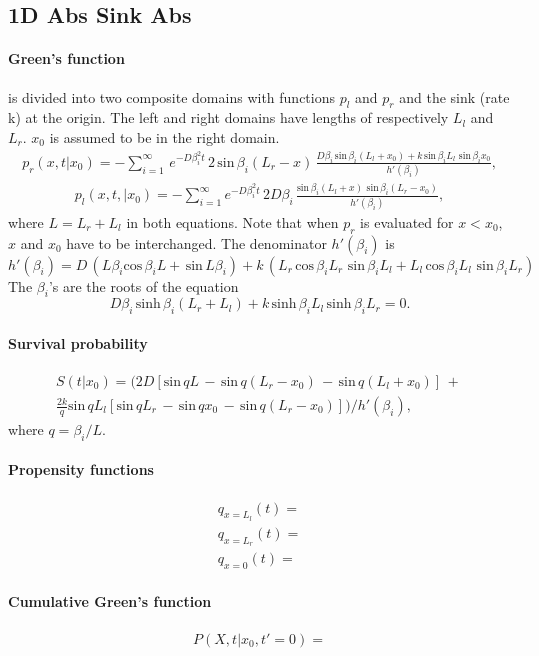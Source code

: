 
\subsection{1D Abs Sink Abs}

\paragraph{Green's function}
is divided into two composite domains with functions $p_l$ and $p_r$ and the sink (rate k) at the origin. The left and right domains have lengths of respectively $L_l$ and $L_r$. $x_0$ is assumed to be in the right domain.
 \begin{multline}
 p_r(x,t|x_0) = - \sum_{i=1}^{\infty} \, e^{- D \beta_i ^2 t} \, 2 \, \mathrm{sin} \, \beta_i (L_r - x) \, \frac{D \beta_i \, \mathrm{sin} \, \beta_i (L_l + x_0) + k \, \mathrm{sin} \, \beta_i L_l \,\, \mathrm{sin} \, \beta_i x_0}{h'( \beta_i )},
\end{multline}
\begin{multline}
 p_l(x,t,|x_0) = -\sum_{i=1}^{\infty} e^{- D \beta_i ^2 t} \, 2 D \beta_i \, \frac{\mathrm{sin} \, \beta_i (L_l + x) \,\, \mathrm{sin} \, \beta_i (L_r - x_0)}{h'( \beta_i )},
\end{multline}
where $L=L_r + L_l$ in both equations. Note that when $p_r$ is evaluated for $x<x_0$, $x$ and $x_0$ have to be interchanged. The denominator $h'( \beta_i )$ is
\begin{equation*}
h'( \beta_i ) = D \, (L \beta_i \mathrm{cos} \, \beta_i L + \, \mathrm{sin} \, L \beta_i ) + k \,( L_r \, \mathrm{cos} \, \beta_i L_r \,\, \mathrm{sin} \, \beta_i L_l + L_l \, \mathrm{cos} \, \beta_i L_l \,\, \mathrm{sin} \, \beta_i L_r )
\end{equation*}
The $\beta_i$'s are the roots of the equation
\begin{equation*} 
 D\beta_i \, \mathrm{sinh} \, \beta_i (L_r + L_l) + k \, \mathrm{sinh} \, \beta_i L_l \, \mathrm{sinh} \, \beta_i L_r = 0.
\end{equation*}

\paragraph{Survival probability}
\begin{multline}
S(t|x_0) = \bigg( 2 D \left[ \mathrm{sin} \, q L \, - \, \mathrm{sin} \, q (L_r - x_0) \, - \, \mathrm{sin} \, q (L_l + x_0)  \right] \, + \, \\ 
 \frac{2 k}{q} \mathrm{sin} \, q L_l \left[ \mathrm{sin} \, q L_r \, - \, \mathrm{sin} \, q x_0 \, - \, \mathrm{sin} \, q (L_r - x_0) \right] \bigg) / h'( \beta_i ),
\end{multline}
where $q = \beta_i / L$.

\paragraph{Propensity functions}
\begin{align}
  q_{x=L_l}(t) = \\
  q_{x=L_r}(t) = \\
  q_{x=0}(t) =
\end{align}

\paragraph{Cumulative Green's function}
\begin{align}
  P(X,t|x_0,t'=0) =
\end{align}